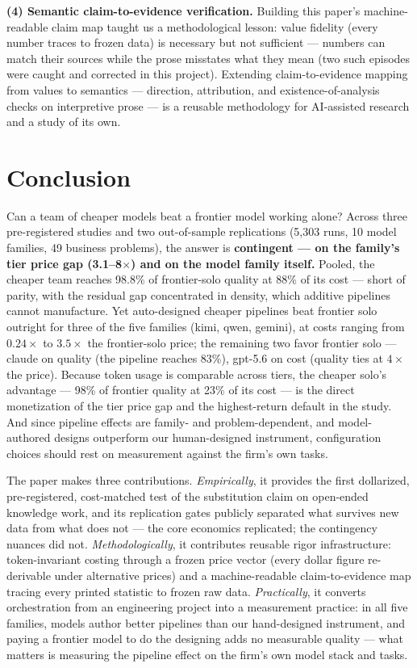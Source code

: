 \documentclass[12pt,a4paper]{article}
\begin{document}
\textbf{(4) Semantic claim-to-evidence verification.} Building this paper's
machine-readable claim map taught us a methodological lesson: value fidelity
(every number traces to frozen data) is necessary but not sufficient ---
numbers can match their sources while the prose misstates what they mean
(two such episodes were caught and corrected in this project). Extending
claim-to-evidence mapping from values to semantics --- direction, attribution,
and existence-of-analysis checks on interpretive prose --- is a reusable
methodology for AI-assisted research and a study of its own.

\section{Conclusion}\label{sec:conclusion}

Can a team of cheaper models beat a frontier model working alone? Across three
pre-registered studies and two out-of-sample replications (5{,}303 runs, 10
model families, 49 business problems), the answer is \textbf{contingent --- on
the family's tier price gap (3.1--8$\times$) and on the model family itself.}
Pooled, the cheaper team reaches 98.8\% of frontier-solo quality at 88\% of its
cost --- short of parity, with the residual gap concentrated in density, which
additive pipelines cannot manufacture. Yet auto-designed cheaper pipelines beat
frontier solo outright for three of the five families (kimi, qwen, gemini), at
costs ranging from $0.24\times$ to $3.5\times$ the frontier-solo price; the
remaining two favor frontier solo --- claude on quality (the pipeline reaches
83\%), gpt-5.6 on cost (quality ties at $4\times$ the price). Because token
usage is comparable across tiers, the cheaper solo's advantage --- 98\% of
frontier quality at 23\% of its cost --- is the direct monetization of the tier
price gap and the highest-return default in the study. And since pipeline
effects are family- and problem-dependent, and model-authored designs
outperform our human-designed instrument, configuration choices should rest on
measurement against the firm's own tasks.

The paper makes three contributions. \emph{Empirically}, it provides the first
dollarized, pre-registered, cost-matched test of the substitution claim on
open-ended knowledge work, and its replication gates publicly separated what
survives new data from what does not --- the core economics replicated; the
contingency nuances did not. \emph{Methodologically}, it contributes reusable
rigor infrastructure: token-invariant costing through a frozen price vector
(every dollar figure re-derivable under alternative prices) and a
machine-readable claim-to-evidence map tracing every printed statistic to
frozen raw data. \emph{Practically}, it converts orchestration from an
engineering project into a measurement practice: in all five families, models
author better pipelines than our hand-designed instrument, and paying a
frontier model to do the designing adds no measurable quality --- what matters
is measuring the pipeline effect on the firm's own model stack and tasks.
\end{document}
